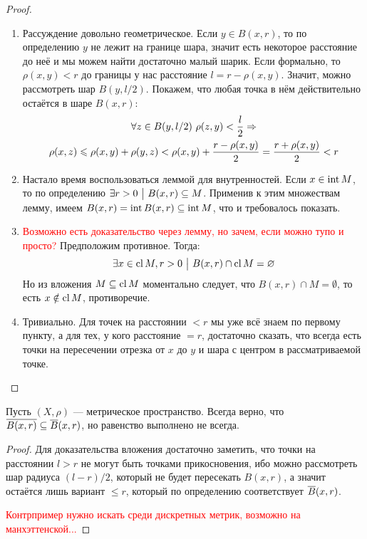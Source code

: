 \begin{proof}~
	\begin{enumerate}
		\item Рассуждение довольно геометрическое. Если $y \in B(x, r)$, то по определению $y$ не лежит на границе шара, значит есть некоторое расстояние до неё и мы можем найти достаточно малый шарик. Если формально, то $\rho(x, y) < r$ до границы у нас расстояние $l = r - \rho(x, y)$. Значит, можно рассмотреть шар $B(y, l / 2)$. Покажем, что любая точка в нём действительно остаётся в шаре $B(x, r)$:
		\begin{multline*}
			\forall z \in B(y, l / 2)\ \rho(z, y) < \frac{l}{2} \Rightarrow
			\\
			\rho(x, z) \leqslant \rho(x, y) + \rho(y, z) < \rho(x, y) + \frac{r - \rho(x, y)}{2} = \frac{r + \rho(x, y)}{2} < r
		\end{multline*}
		
		\item Настало время воспользоваться леммой для внутренностей. Если $x \in \operatorname{int} M$, то по определению $\exists r > 0 \ \big|\  B(x, r) \subseteq M$. Применив к этим множествам лемму, имеем $B(x, r) = \operatorname{int} B(x, r) \subseteq \operatorname{int} M$, что и требовалось показать.
		
		\item \textcolor{red}{Возможно есть доказательство через лемму, но зачем, если можно тупо и просто?} Предположим противное. Тогда:
		\[
			\exists x \in \operatorname{cl} M, r > 0 \ \big|\  B(x, r) \cap \operatorname{cl} M = \varnothing
		\]
		Но из вложения $M \subseteq \operatorname{cl} M$ моментально следует, что $B(x, r) \cap M = \emptyset$, то есть $x \notin \operatorname{cl} M$, противоречие.
		
		\item Тривиально. Для точек на расстоянии $< r$ мы уже всё знаем по первому пункту, а для тех, у кого расстояние $= r$, достаточно сказать, что всегда есть точки на пересечении отрезка от $x$ до $y$ и шара с центром в рассматриваемой точке.
	\end{enumerate}
\end{proof}

\begin{proposition}
	Пусть $(X, \rho)$ --- метрическое пространство. Всегда верно, что \\ $\overline{B(x, r)} \subseteq \overline{B}(x, r)$, но равенство выполнено не всегда.
\end{proposition}

\begin{proof}
	Для доказательства вложения достаточно заметить, что точки на расстоянии $l > r$ не могут быть точками прикосновения, ибо можно рассмотреть шар радиуса $(l - r) / 2$, который не будет пересекать $B(x, r)$, а значит остаётся лишь вариант $\le r$, который по определению соответствует $\overline{B}(x, r)$.
	
	\textcolor{red}{Контрпример нужно искать среди дискретных метрик, возможно на манхэттенской...}
\end{proof}


